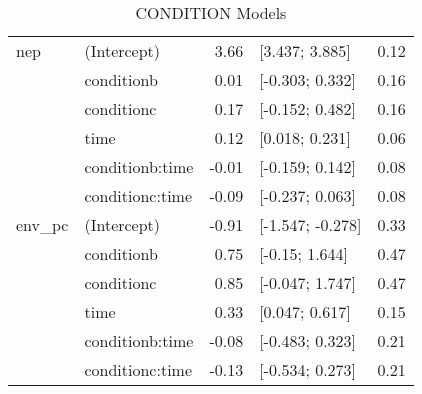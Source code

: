 \begin{table}[ht]
\begin{tabular}{llrlr}
   \hline
nep & (Intercept) & 3.66 & [3.437; 3.885] & 0.12 \\ 
   & conditionb & 0.01 & [-0.303; 0.332] & 0.16 \\ 
   & conditionc & 0.17 & [-0.152; 0.482] & 0.16 \\ 
   & time & 0.12 & [0.018; 0.231] & 0.06 \\ 
   & conditionb:time & -0.01 & [-0.159; 0.142] & 0.08 \\ 
   & conditionc:time & -0.09 & [-0.237; 0.063] & 0.08 \\ 
   \hline
env\_pc & (Intercept) & -0.91 & [-1.547; -0.278] & 0.33 \\ 
   & conditionb & 0.75 & [-0.15; 1.644] & 0.47 \\ 
   & conditionc & 0.85 & [-0.047; 1.747] & 0.47 \\ 
   & time & 0.33 & [0.047; 0.617] & 0.15 \\ 
   & conditionb:time & -0.08 & [-0.483; 0.323] & 0.21 \\ 
   & conditionc:time & -0.13 & [-0.534; 0.273] & 0.21 \\ 
   \hline
\end{tabular}
\caption{CONDITION Models } 
\label{tab:condition-models}
\end{table}
